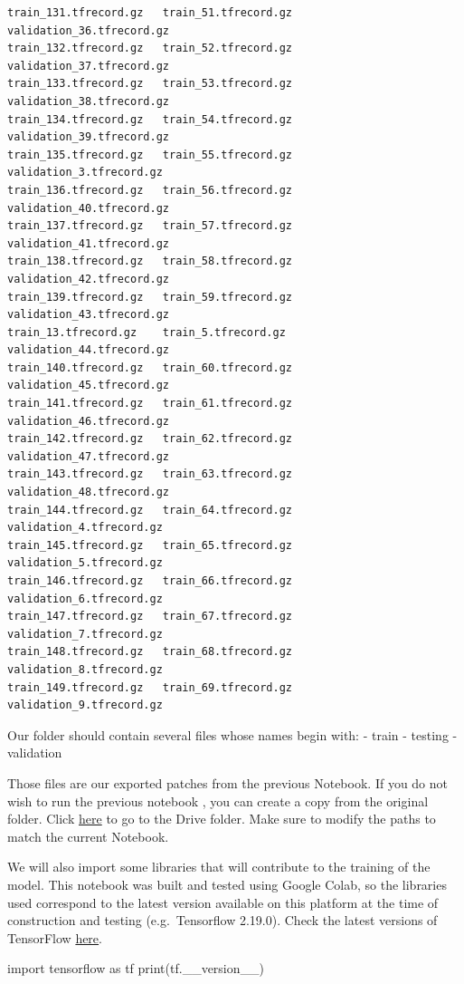 \documentclass[
  letterpaper,
  DIV=11,
  numbers=noendperiod]{scrreprt}
\newenvironment{Shaded}{\begin{snugshade}}{\end{snugshade}}
\newcommand{\BuiltInTok}[1]{\textcolor[rgb]{0.00,0.23,0.31}{#1}}
\newcommand{\ImportTok}[1]{\textcolor[rgb]{0.00,0.46,0.62}{#1}}
\newcommand{\NormalTok}[1]{\textcolor[rgb]{0.00,0.23,0.31}{#1}}
\begin{document}
\begin{verbatim}
train_131.tfrecord.gz   train_51.tfrecord.gz   validation_36.tfrecord.gz
train_132.tfrecord.gz   train_52.tfrecord.gz   validation_37.tfrecord.gz
train_133.tfrecord.gz   train_53.tfrecord.gz   validation_38.tfrecord.gz
train_134.tfrecord.gz   train_54.tfrecord.gz   validation_39.tfrecord.gz
train_135.tfrecord.gz   train_55.tfrecord.gz   validation_3.tfrecord.gz
train_136.tfrecord.gz   train_56.tfrecord.gz   validation_40.tfrecord.gz
train_137.tfrecord.gz   train_57.tfrecord.gz   validation_41.tfrecord.gz
train_138.tfrecord.gz   train_58.tfrecord.gz   validation_42.tfrecord.gz
train_139.tfrecord.gz   train_59.tfrecord.gz   validation_43.tfrecord.gz
train_13.tfrecord.gz    train_5.tfrecord.gz    validation_44.tfrecord.gz
train_140.tfrecord.gz   train_60.tfrecord.gz   validation_45.tfrecord.gz
train_141.tfrecord.gz   train_61.tfrecord.gz   validation_46.tfrecord.gz
train_142.tfrecord.gz   train_62.tfrecord.gz   validation_47.tfrecord.gz
train_143.tfrecord.gz   train_63.tfrecord.gz   validation_48.tfrecord.gz
train_144.tfrecord.gz   train_64.tfrecord.gz   validation_4.tfrecord.gz
train_145.tfrecord.gz   train_65.tfrecord.gz   validation_5.tfrecord.gz
train_146.tfrecord.gz   train_66.tfrecord.gz   validation_6.tfrecord.gz
train_147.tfrecord.gz   train_67.tfrecord.gz   validation_7.tfrecord.gz
train_148.tfrecord.gz   train_68.tfrecord.gz   validation_8.tfrecord.gz
train_149.tfrecord.gz   train_69.tfrecord.gz   validation_9.tfrecord.gz
\end{verbatim}

Our folder should contain several files whose names begin with: - train
- testing - validation

Those files are our exported patches from the previous Notebook. If you
do not wish to run the previous notebook , you can create a copy from
the original folder. Click
\href{https://drive.google.com/drive/folders/1v30R0-2j5WkgekRxYUw4PHS04c2N9YJR}{here}
to go to the Drive folder. Make sure to modify the paths to match the
current Notebook.

We will also import some libraries that will contribute to the training
of the model. This notebook was built and tested using Google Colab, so
the libraries used correspond to the latest version available on this
platform at the time of construction and testing (e.g.~Tensorflow
2.19.0). Check the latest versions of TensorFlow
\href{https://www.tensorflow.org/}{here}.

\begin{Shaded}
\begin{Highlighting}[]
\ImportTok{import}\NormalTok{ tensorflow }\ImportTok{as}\NormalTok{ tf}
\BuiltInTok{print}\NormalTok{(tf.\_\_version\_\_)}
\end{Highlighting}
\end{Shaded}
\end{document}
